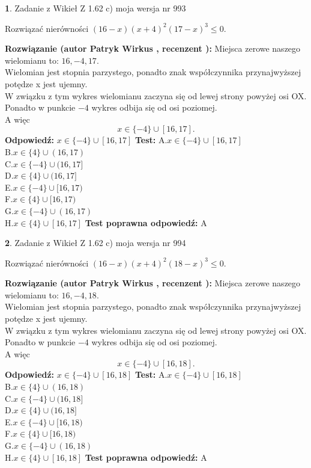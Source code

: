 \documentclass[12pt, a4paper]{article}
\theoremstyle{definition} %
\newtheorem{zad}{}
\newcommand{\zadStart}[1]{\begin{zad}#1\newline}
\newcommand{\zadStop}{\end{zad}}
\newcommand{\rozwStart}[2]{\noindent \textbf{Rozwiązanie (autor #1 , recenzent #2): }\newline}
\newcommand{\rozwStop}{\newline}
\newcommand{\odpStart}{\noindent \textbf{Odpowiedź:}\newline}
\newcommand{\odpStop}{\newline}
\newcommand{\testStart}{\noindent \textbf{Test:}\newline}
\newcommand{\testStop}{\newline}
\newcommand{\kluczStart}{\noindent \textbf{Test poprawna odpowiedź:}\newline}
\newcommand{\kluczStop}{\newline}
\begin{document}
\zadStart{Zadanie z Wikieł Z 1.62 c) moja wersja nr 993}

Rozwiązać nierówności $(16-x)(x+4)^{2}(17-x)^{3}\le0$.
\zadStop
\rozwStart{Patryk Wirkus}{}
Miejsca zerowe naszego wielomianu to: $16, -4, 17$.\\
Wielomian jest stopnia parzystego, ponadto znak współczynnika przy\linebreak najwyższej potędze x jest ujemny.\\ W związku z tym wykres wielomianu zaczyna się od lewej strony powyżej osi OX.\\
Ponadto w punkcie $-4$ wykres odbija się od osi poziomej.\\
A więc $$x \in \{-4\} \cup [16,17].$$
\rozwStop
\odpStart
$x \in \{-4\} \cup [16,17]$
\odpStop
\testStart
A.$x \in \{-4\} \cup [16,17]$\\
B.$x \in \{4\} \cup (16,17)$\\
C.$x \in \{-4\} \cup (16,17]$\\
D.$x \in \{4\} \cup (16,17]$\\
E.$x \in \{-4\} \cup [16,17)$\\
F.$x \in \{4\} \cup [16,17)$\\
G.$x \in \{-4\} \cup (16,17)$\\
H.$x \in \{4\} \cup [16,17]$
\testStop
\kluczStart
A
\kluczStop



\zadStart{Zadanie z Wikieł Z 1.62 c) moja wersja nr 994}

Rozwiązać nierówności $(16-x)(x+4)^{2}(18-x)^{3}\le0$.
\zadStop
\rozwStart{Patryk Wirkus}{}
Miejsca zerowe naszego wielomianu to: $16, -4, 18$.\\
Wielomian jest stopnia parzystego, ponadto znak współczynnika przy\linebreak najwyższej potędze x jest ujemny.\\ W związku z tym wykres wielomianu zaczyna się od lewej strony powyżej osi OX.\\
Ponadto w punkcie $-4$ wykres odbija się od osi poziomej.\\
A więc $$x \in \{-4\} \cup [16,18].$$
\rozwStop
\odpStart
$x \in \{-4\} \cup [16,18]$
\odpStop
\testStart
A.$x \in \{-4\} \cup [16,18]$\\
B.$x \in \{4\} \cup (16,18)$\\
C.$x \in \{-4\} \cup (16,18]$\\
D.$x \in \{4\} \cup (16,18]$\\
E.$x \in \{-4\} \cup [16,18)$\\
F.$x \in \{4\} \cup [16,18)$\\
G.$x \in \{-4\} \cup (16,18)$\\
H.$x \in \{4\} \cup [16,18]$
\testStop
\kluczStart
A
\kluczStop
\end{document}
